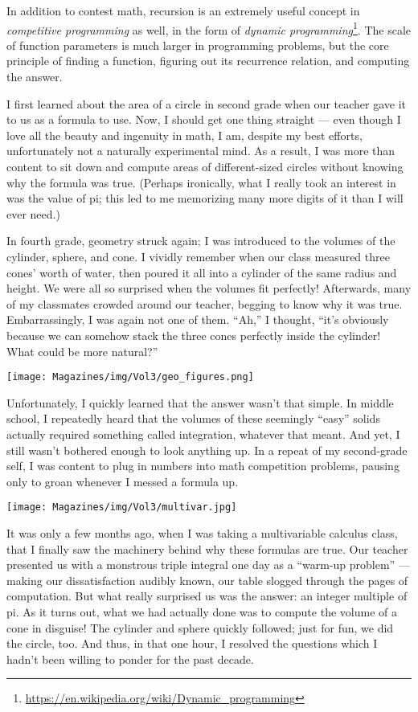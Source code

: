\documentclass{article}
\begin{document}
\begin{multicols}{3}
In addition to contest math, recursion is an extremely useful concept in \textit{competitive programming} as well, in the form of \textit{dynamic programming}\footnote{\url{https://en.wikipedia.org/wiki/Dynamic\_programming}}. The scale of function parameters is much larger in programming problems, but the core principle of finding a function, figuring out its recurrence relation, and computing the answer.
\closearticle

I first learned about the area of a circle in second grade when our teacher gave it to us as a formula to use. Now, I should get one thing straight — even though I love all the beauty and ingenuity in math, I am, despite my best efforts, unfortunately not a naturally experimental mind. As a result, I was more than content to sit down and compute areas of different-sized circles without knowing why the formula was true. (Perhaps ironically, what I really took an interest in was the value of pi; this led to me memorizing many more digits of it than I will ever need.) 

In fourth grade, geometry struck again; I was introduced to the volumes of the cylinder, sphere, and cone. I vividly remember when our class measured three cones’ worth of water, then poured it all into a cylinder of the same radius and height. We were all so surprised when the volumes fit perfectly! Afterwards, many of my classmates crowded around our teacher, begging to know why it was true. Embarrassingly, I was again not one of them. “Ah,” I thought, “it’s obviously because we can somehow stack the three cones perfectly inside the cylinder! What could be more natural?” 
\begin{center}
\texttt{[image: Magazines/img/Vol3/geo\_figures.png]}
\end{center}
Unfortunately, I quickly learned that the answer wasn’t that simple. In middle school, I repeatedly heard that the volumes of these seemingly “easy” solids actually required something called integration, whatever that meant. And yet, I still wasn’t bothered enough to look anything up. In a repeat of my second-grade self, I was content to plug in numbers into math competition problems, pausing only to groan whenever I messed a formula up. 
\begin{center}
\texttt{[image: Magazines/img/Vol3/multivar.jpg]}
\end{center}
It was only a few months ago, when I was taking a multivariable calculus class, that I finally saw the machinery behind why these formulas are true. Our teacher presented us with a monstrous triple integral one day as a “warm-up problem” — making our dissatisfaction audibly known, our table slogged through the pages of computation. But what really surprised us was the answer: an integer multiple of pi. As it turns out, what we had actually done was to compute the volume of a cone in disguise! The cylinder and sphere quickly followed; just for fun, we did the circle, too. And thus, in that one hour, I resolved the questions which I hadn’t been willing to ponder for the past decade. 


\end{multicols}
\end{document}
